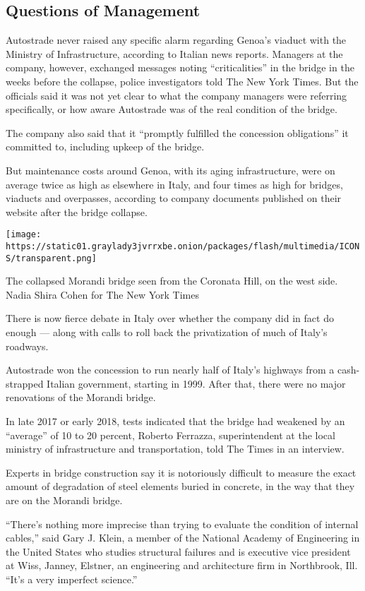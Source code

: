\hypertarget{questions-of-management}{%
\subsection{Questions of Management}\label{questions-of-management}}

Autostrade never raised any specific alarm regarding Genoa's viaduct
with the Ministry of Infrastructure, according to Italian news reports.
Managers at the company, however, exchanged messages noting
``criticalities'' in the bridge in the weeks before the collapse, police
investigators told The New York Times. But the officials said it was not
yet clear to what the company managers were referring specifically, or
how aware Autostrade was of the real condition of the bridge.

The company also said that it ``promptly fulfilled the concession
obligations'' it committed to, including upkeep of the bridge.

But maintenance costs around Genoa, with its aging infrastructure, were
on average twice as high as elsewhere in Italy, and four times as high
for bridges, viaducts and overpasses, according to company documents
published on their website after the bridge collapse.

\texttt{[image: https://static01.graylady3jvrrxbe.onion/packages/flash/multimedia/ICONS/transparent.png]}

The collapsed Morandi bridge seen from the Coronata Hill, on the west
side. Nadia Shira Cohen for The New York Times

There is now fierce debate in Italy over whether the company did in fact
do enough --- along with calls to roll back the privatization of much of
Italy's roadways.

Autostrade won the concession to run nearly half of Italy's highways
from a cash-strapped Italian government, starting in 1999. After that,
there were no major renovations of the Morandi bridge.

In late 2017 or early 2018, tests indicated that the bridge had weakened
by an ``average'' of 10 to 20 percent, Roberto Ferrazza, superintendent
at the local ministry of infrastructure and transportation, told The
Times in an interview.

Experts in bridge construction say it is notoriously difficult to
measure the exact amount of degradation of steel elements buried in
concrete, in the way that they are on the Morandi bridge.

``There's nothing more imprecise than trying to evaluate the condition
of internal cables,'' said Gary J. Klein, a member of the National
Academy of Engineering in the United States who studies structural
failures and is executive vice president at Wiss, Janney, Elstner, an
engineering and architecture firm in Northbrook, Ill. ``It's a very
imperfect science.''

